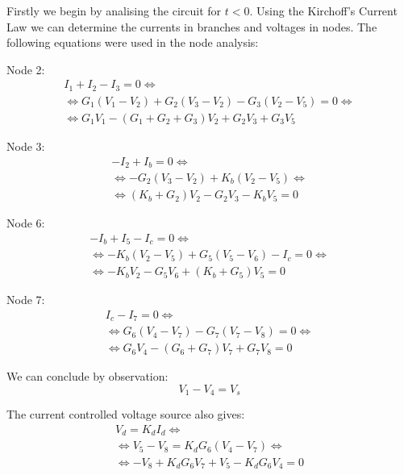 \hspace{12pt} Firstly we begin by analising the circuit for $t<0$. Using the Kirchoff's Current Law we can determine the currents in branches and voltages in nodes. The following equations were used in the node analysis:

\vspace{10pt}
Node 2:
\begin{gather}
    I_1+I_2-I_3=0 \iff \nonumber \\ 
    \iff G_1(V_1-V_2)+G_2(V_3-V_2)-G_3(V_2-V_5)=0 \iff \\
    \iff G_1V_1-(G_1+G_2+G_3)V_2+G_2V_3+G_3V_5 \nonumber
\end{gather}

Node 3:
\begin{gather}
    -I_2+I_b=0 \iff \nonumber \\
    \iff -G_2(V_3-V_2)+K_b(V_2-V_5) \iff \\
    \iff (K_b+G_2)V_2-G_2V_3-K_bV_5=0 \nonumber
\end{gather}

Node 6:
\begin{gather}
    -I_b+I_5-I_c=0 \iff \nonumber \\
    \iff -K_b(V_2-V_5)+G_5(V_5-V_6)-I_c=0 \iff \\
    \iff -K_bV_2-G_5V_6+(K_b+G_5)V_5=0 \nonumber
\end{gather}

Node 7:
\begin{gather}
    I_c-I_7=0 \iff \nonumber \\
    \iff G_6(V_4-V_7)-G_7(V_7-V_8)=0 \iff \\
    \iff G_6V_4-(G_6+G_7)V_7+G_7V_8=0 \nonumber
\end{gather}
\vspace{5pt}

We can conclude by observation:
\begin{equation}
    V_1-V_4=V_s
\end{equation}
\vspace{5pt}

The current controlled voltage source also gives:
\begin{gather}
    V_d=K_dI_d \iff \nonumber \\
    \iff V_5-V_8=K_dG_6(V_4-V_7) \iff \\
    \iff -V_8+K_dG_6V_7+V_5-K_dG_6V_4=0 \nonumber
\end{gather}
\vspace{5pt}

